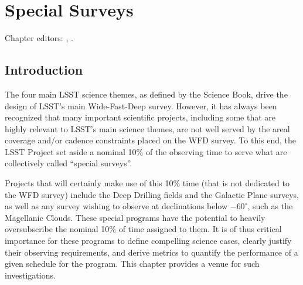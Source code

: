 \chapter[Special Surveys]{Special Surveys}
\def\chpname{specialsurveys}\label{chp:\chpname}

Chapter editors:
,
.




\section{Introduction}
\label{sec:specials:intro}

The four main LSST science themes, as defined by the Science Book,
drive the design of LSST's main Wide-Fast-Deep survey.  However, it
has always been recognized that many important scientific projects,
including some that are highly relevant to LSST's main science themes,
are not well served by the areal coverage and/or cadence constraints
placed on the WFD survey.  To this end, the LSST Project set aside a
nominal 10\% of the observing time to serve what are collectively
called ``special surveys''.

Projects that
will certainly make use of this 10\% time (that is not dedicated to the WFD
survey) include the Deep Drilling fields and the Galactic Plane surveys,
as well as any survey wishing to
observe at declinations below $-60^\circ$, such as the Magellanic
Clouds.  These special programs have the potential to
heavily oversubscribe the nominal 10\%
of time assigned to them.  It is of thus critical importance for these
programs to define compelling science cases, clearly justify their
observing requirements, and derive metrics to quantify the performance
of a given schedule for the program. This chapter provides a venue for
such investigations.



